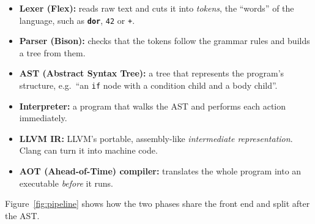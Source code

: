 \documentclass[11pt,a4paper]{article}
\newcommand{\kw}[1]{\texttt{\textcolor{cInput}{\textbf{#1}}}}
\newcommand{\fn}[1]{\texttt{#1}}
\begin{document}
\begin{defbox}
\begin{itemize}[leftmargin=*]
\item \textbf{Lexer (Flex):} reads raw text and cuts it into \emph{tokens}, the ``words'' of the language, such as \kw{dor}, \fn{42} or \fn{+}.
\item \textbf{Parser (Bison):} checks that the tokens follow the grammar rules and builds a tree from them.
\item \textbf{AST (Abstract Syntax Tree):} a tree that represents the program's structure, e.g.\ ``an \fn{if} node with a condition child and a body child''.
\item \textbf{Interpreter:} a program that walks the AST and performs each action immediately.
\item \textbf{LLVM IR:} LLVM's portable, assembly-like \emph{intermediate representation}. Clang can turn it into machine code.
\item \textbf{AOT (Ahead-of-Time) compiler:} translates the whole program into an executable \emph{before} it runs.
\end{itemize}
\end{defbox}

Figure~\ref{fig:pipeline} shows how the two phases share the front end and split after the AST.
\end{document}
